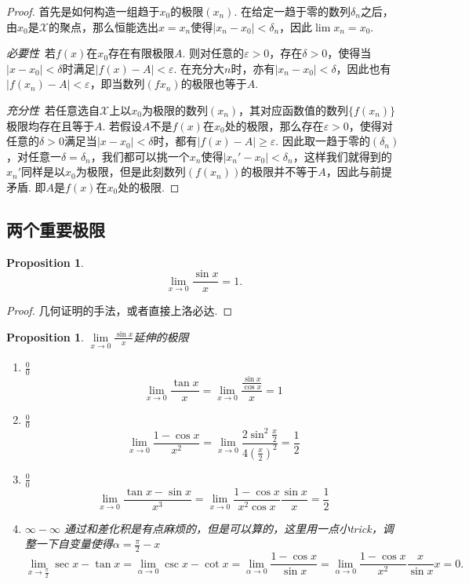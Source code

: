\documentclass{article}
\newtheorem{proposition}[theorem]{Proposition}
\begin{document}
\begin{proof}
\rm 首先是如何构造一组趋于$x_0$的极限$(x_n)$. 在给定一趋于零的数列${\delta_n}$之后，由$x_0$是$\mathcal{X}$的聚点，那么恒能选出$x = x_n$使得$|x_n - x_0| < \delta_n$，因此$\lim x_n = x_0$. 

\emph{必要性}\ 若$f(x)$在$x_0$存在有限极限$A$. 则对任意的$\varepsilon > 0$，存在$\delta > 0$，使得当$|x-x_0| < \delta$时满足$|f(x)-A| < \varepsilon$. 在充分大$n$时，亦有$|x_n - x_0| < \delta$，因此也有$|f(x_n)-A| < \varepsilon$，即当数列$(f{x_n})$的极限也等于$A$. 

\emph{充分性}\ 若任意选自$\mathcal{X}$上以$x_0$为极限的数列$(x_n)$，其对应函数值的数列$\{f(x_n)\}$极限均存在且等于$A$. 若假设$A$不是$f(x)$在$x_0$处的极限，那么存在$\varepsilon > 0$，使得对任意的$\delta > 0$满足当$|x-x_0| < \delta$时，都有$|f(x)-A| \geq \varepsilon$. 因此取一趋于零的$(\delta_n)$，对任意一$\delta = \delta_n$，我们都可以挑一个$x_n$使得$|x_n' -x_0| < \delta_n$，这样我们就得到的${x_n'}$同样是以$x_0$为极限，但是此刻数列$(f(x_n))$的极限并不等于$A$，因此与前提矛盾. 即$A$是$f(x)$在$x_0$处的极限.  
\end{proof}



\subsection{两个重要极限}

\begin{proposition}
$$
\lim\limits_{x \rightarrow 0} \frac{\sin x}{x} = 1.
$$
\end{proposition}

\begin{proof}
几何证明的手法，或者直接上洛必达.
\end{proof}

\begin{proposition}
\rm {\color{blue}$\lim\limits_{x \rightarrow 0} \frac{\sin x}{x}$延伸的极限}
\begin{enumerate}
	\item $\frac{0}{0}$
	$$
	\lim\limits_{x \rightarrow 0} \frac{\tan x}{x} = \lim\limits_{x \rightarrow 0} \frac{\frac{\sin x}{\cos x}}{x} = 1
	$$
	\item $\frac{0}{0}$
	$$
	\lim\limits_{x \rightarrow 0} \frac{1-\cos x}{x^2} = \lim\limits_{x \rightarrow 0} \frac{2\sin^2\frac{x}{2}}{4(\frac{x}{2})^2} = \frac{1}{2}
	$$
	\item $\frac{0}{0}$
	$$
	\lim\limits_{x \rightarrow 0} \frac{\tan x-\sin x}{x^3} = \lim\limits_{x \rightarrow 0} \frac{1-\cos x}{x^2\cos x}\frac{\sin x}{x} = \frac{1}{2}
	$$
	\item $\infty - \infty$ 通过和差化积是有点麻烦的，但是可以算的，这里用一点小trick，调整一下自变量使得$\alpha = \frac{\pi}{2} - x$
	$$
		\lim\limits_{x \rightarrow \frac{\pi}{2}} \sec x -\tan x = \lim\limits_{\alpha \rightarrow 0} \csc x - \cot x = \lim\limits_{\alpha \rightarrow 0} \frac{1-\cos x}{\sin x} = \lim\limits_{\alpha \rightarrow 0} \frac{1-\cos x}{x^2} \frac{x}{\sin x} x = 0.
	$$
\end{enumerate}
\end{proposition}
\end{document}
